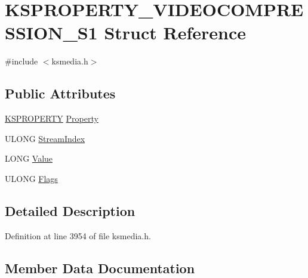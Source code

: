 \hypertarget{struct_k_s_p_r_o_p_e_r_t_y___v_i_d_e_o_c_o_m_p_r_e_s_s_i_o_n___s1}{}\section{K\+S\+P\+R\+O\+P\+E\+R\+T\+Y\+\_\+\+V\+I\+D\+E\+O\+C\+O\+M\+P\+R\+E\+S\+S\+I\+O\+N\+\_\+\+S1 Struct Reference}
\label{struct_k_s_p_r_o_p_e_r_t_y___v_i_d_e_o_c_o_m_p_r_e_s_s_i_o_n___s1}


{\ttfamily \#include $<$ksmedia.\+h$>$}

\subsection*{Public Attributes}
\begin{DoxyCompactItemize}
\item 
\hyperlink{ks_8h_a4392f77c74e868d813d46c39ada4d660}{K\+S\+P\+R\+O\+P\+E\+R\+TY} \hyperlink{struct_k_s_p_r_o_p_e_r_t_y___v_i_d_e_o_c_o_m_p_r_e_s_s_i_o_n___s1_af7101d58d3f5b1f1ca52d2f6483035f8}{Property}
\item 
U\+L\+O\+NG \hyperlink{struct_k_s_p_r_o_p_e_r_t_y___v_i_d_e_o_c_o_m_p_r_e_s_s_i_o_n___s1_a5939197aa394df413e6376939486758d}{Stream\+Index}
\item 
L\+O\+NG \hyperlink{struct_k_s_p_r_o_p_e_r_t_y___v_i_d_e_o_c_o_m_p_r_e_s_s_i_o_n___s1_adcc9f8628c882d79a8bfafc50d2002e9}{Value}
\item 
U\+L\+O\+NG \hyperlink{struct_k_s_p_r_o_p_e_r_t_y___v_i_d_e_o_c_o_m_p_r_e_s_s_i_o_n___s1_aa86af109e4e8456b2975af88bd2260db}{Flags}
\end{DoxyCompactItemize}


\subsection{Detailed Description}


Definition at line 3954 of file ksmedia.\+h.



\subsection{Member Data Documentation}
